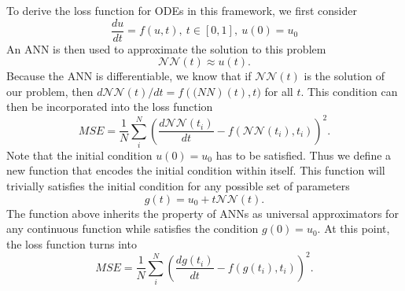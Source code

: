 To derive the loss function for \glspl{ODE} in this framework, we first consider
\begin{equation*}
    \frac{du}{dt} = f(u, t),\ t \in [0, 1],\ u(0) = u_0
\end{equation*}
An \gls{ANN} is then used to approximate the solution to this problem
\begin{equation*}
    \mathcal{NN}(t) \approx u(t).
\end{equation*}
Because the \gls{ANN} is differentiable, we know that if $\mathcal{NN}(t)$ is the solution of our problem, then $d\mathcal{NN}(t)/dt = f(\mathcal(NN)(t), t)$ for all $t$.
This condition can then be incorporated into the loss function
\begin{equation*}
    MSE = \frac{1}{N} \sum_i^N \left( \frac{d\mathcal{NN}(t_i)}{dt} - f(\mathcal{NN}(t_i), t_i) \right)^2.
\end{equation*}
Note that the initial condition $u(0) = u_0$ has to be satisfied.
Thus we define a new function that encodes the initial condition within itself. This function will trivially satisfies the initial condition for any possible set of parameters
\begin{equation*}
    g(t) = u_0 + t\mathcal{NN}(t).
\end{equation*}
The function above inherits the property of \glspl{ANN} as universal approximators for any continuous function while satisfies the condition $g(0) = u_0$.
At this point, the loss function turns into
\begin{equation*}
    MSE = \frac{1}{N} \sum_i^N \left( \frac{dg(t_i)}{dt} - f(g(t_i), t_i) \right)^2.
\end{equation*}

